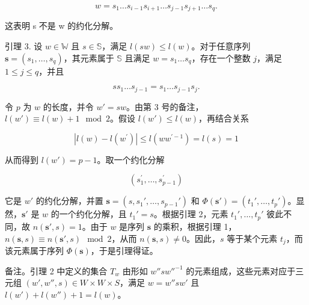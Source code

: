 \[
w = s _ {1} \dots s _ {i - 1} s _ {i + 1} \dots s _ {j - 1} s _ {j + 1} \dots s _ {q}.
\]

这表明 s 不是 w 的约化分解。

引理 3. 设 \(w \in \mathbb{W}\) 且 \(s \in \mathbb{S}\)，满足 \(l(sw) \leqslant l(w)\)。对于任意序列 \(\mathbf{s} = (s_1, \ldots, s_q)\)，其元素属于 \(\mathbb{S}\) 且满足 \(w = s_1 \ldots s_q\)，存在一个整数 \(j\)，满足 \(1 \leqslant j \leqslant q\)，并且

\[
s s _ {1} \dots s _ {j - 1} = s _ {1} \dots s _ {j - 1} s _ {j}.
\]

令 \(p\) 为 \(w\) 的长度，并令 \(w' = sw\)。由第 3 号的备注，\(l(w') \equiv l(w) + 1 \mod 2\)。假设 \(l(w') \leqslant l(w)\)，再结合关系

\[
| l (w) - l (w ^ {\prime}) | \leqslant l (w w ^ {\prime - 1}) = l (s) = 1
\]

从而得到 \(l(w') = p - 1\)。取一个约化分解

\[
\left(s _ {1} ^ {\prime}, \ldots , s _ {p - 1} ^ {\prime}\right)
\]

它是 \(w'\) 的约化分解，并置 \(\mathbf{s} = (s, s_1', \ldots, s_{p-1}')\) 和 \(\Phi(\mathbf{s}') = (t_1', \ldots, t_p')\)。显然，\(\mathbf{s}'\) 是 \(w\) 的一个约化分解，且 \(t_1' = s\)。根据引理 2，元素 \(t_1', \ldots, t_p'\) 彼此不同，故 \(n(\mathbf{s}', s) = 1\)。由于 \(w\) 是序列 \(\mathbf{s}\) 的乘积，根据引理 1，\(n(\mathbf{s}, s) \equiv n(\mathbf{s}', s) \mod 2\)，从而 \(n(\mathbf{s}, s) \neq 0\)。因此，\(s\) 等于某个元素 \(t_j\)，而该元素属于序列 \(\Phi(\mathbf{s})\)，于是引理得证。

备注。引理 2 中定义的集合 \(T_{w}\) 由形如 \(w''sw''^{-1}\) 的元素组成，这些元素对应于三元组 \((w', w'', s) \in W \times W \times S\)，满足 \(w = w''sw'\) 且 \(l(w') + l(w'') + 1 = l(w)\)。

